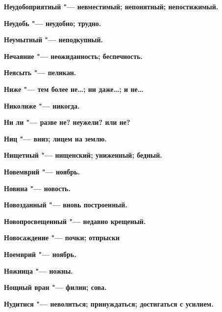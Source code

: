 \begin{mymulticols}{2}
\bfseries Неудобоприятный\normalfont{} "--- невместимый; непонятный; непостижимый. 




\bfseries Неудобь\normalfont{} "--- неудобно; трудно. 




\bfseries Неумытный\normalfont{} "--- неподкупный. 




\bfseries Нечаяние\normalfont{} "--- неожиданность; беспечность. 




\bfseries Неясыть\normalfont{} "--- пеликан. 




\bfseries Ниже\normalfont{} "--- тем более не…; ни даже…; и не… 




\bfseries Николиже\normalfont{} "--- никогда. 




\bfseries Ни ли\normalfont{} "--- разве не? неужели? или не? 




\bfseries Ниц\normalfont{} "--- вниз; лицем на землю. 




\bfseries Нищетный\normalfont{} "--- нищенский; униженный; бедный. 




\bfseries Новемврий\normalfont{} "--- ноябрь. 




\bfseries Новина\normalfont{} "--- новость. 




\bfseries Новозданный\normalfont{} "--- вновь построенный. 




\bfseries Новопросвещенный\normalfont{} "--- недавно крещеный. 




\bfseries Новосаждение\normalfont{} "--- почки; отпрыски 




\bfseries Ноемврий\normalfont{} "--- ноябрь. 




\bfseries Ножница\normalfont{} "--- ножны. 




\bfseries Нощный вран\normalfont{} "--- филин; сова. 




\bfseries Нудитися\normalfont{} "--- неволиться; принуждаться; достигаться с усилием. 





\end{mymulticols}
